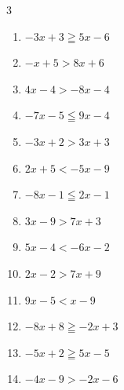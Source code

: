 \begin{multicols}{3}
\begin{enumerate}
  \item $-3x+3\geqq 5x-6$


  \item $-x+5>8x+6$


  \item $4x-4>-8x-4$

        \phantom{$\displaystyle x>0$}

  \item $-7x-5\leqq 9x-4$


  \item $-3x+2>3x+3$


  \item $2x+5<-5x-9$

        \phantom{$\displaystyle x<-2$}

  \item $-8x-1\leqq 2x-1$

        \phantom{$\displaystyle x\geqq 0$}

  \item $3x-9>7x+3$

        \phantom{$\displaystyle x<-3$}

  \item $5x-4<-6x-2$


\columnbreak %

  \item $2x-2>7x+9$


  \item $9x-5<x-9$


  \item $-8x+8\geqq -2x+3$


  \item $-5x+2\geqq 5x-5$


  \item $-4x-9>-2x-6$


\end{enumerate}
\end{multicols}
